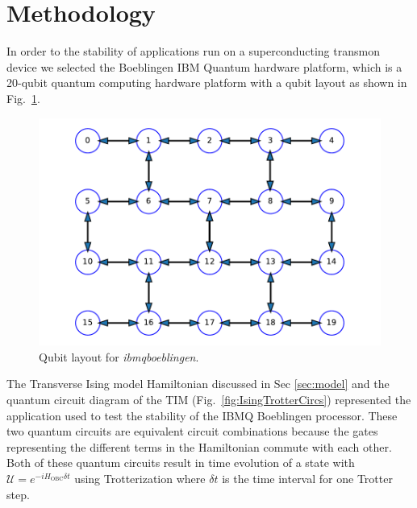 
\section{Methodology}
\label{sec:methodology}
In order to  the stability of applications run on a superconducting transmon device we selected the Boeblingen IBM Quantum hardware platform, which is a 20-qubit quantum computing hardware platform with a qubit layout as shown in Fig.~\ref{fig:Boeblingen_layout}. 
\begin{figure}[htpb]
    \centering
    \includegraphics[scale=0.4]{QubitsBoeblingen.pdf}
    \caption{Qubit layout for \emph{ibmq\textunderscore  boeblingen}.    }
    \label{fig:Boeblingen_layout}
\end{figure}

The Transverse Ising model Hamiltonian discussed in Sec \ref{sec:model} and the
quantum circuit diagram of the TIM (Fig.~\ref{fig:IsingTrotterCircs}) represented the application used to test the stability of the IBMQ Boeblingen processor. These two quantum circuits are equivalent circuit combinations because the gates representing the different terms in the Hamiltonian commute with each other. Both of these quantum circuits result in time evolution  of a state with $\mathcal{U}=e^{-iH_{\text{OBC}}\delta t}$ using Trotterization where $\delta t$ is the time interval for one Trotter step. 


